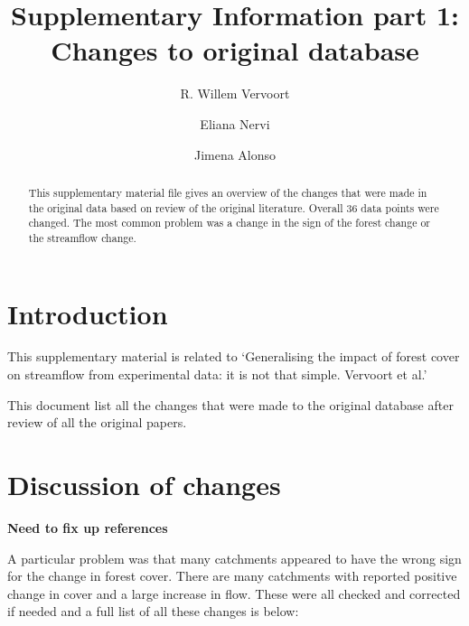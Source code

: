 \documentclass[]{elsarticle} %
\begin{document}
\begin{frontmatter}

  \title{Supplementary Information part 1: Changes to original database}
    \author[]{R. Willem Vervoort%
  }
    \author[]{Eliana Nervi}
    \author[]{Jimena Alonso}
  
  \begin{abstract}
  This supplementary material file gives an overview of the changes that were made in the original data based on review of the original literature. Overall 36 data points were changed. The most common problem was a change in the sign of the forest change or the streamflow change.
  \end{abstract}
  
 \end{frontmatter}

\hypertarget{introduction}{%
\section{Introduction}\label{introduction}}

This supplementary material is related to `Generalising the impact of forest cover on streamflow from experimental data: it is not that simple. Vervoort et al.'

This document list all the changes that were made to the original \citet{zhang2017} database after review of all the original papers.

\hypertarget{discussion-of-changes}{%
\section{Discussion of changes}\label{discussion-of-changes}}

\textbf{Need to fix up references}

A particular problem was that many catchments appeared to have the wrong sign for the change in forest cover. There are many catchments with reported positive change in cover and a large increase in flow. These were all checked and corrected if needed and a full list of all these changes is below:
\end{document}
